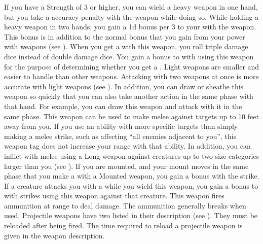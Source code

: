         If you have a Strength of 3 or higher, you can wield a heavy weapon in one hand, but you take a  accuracy penalty with the weapon while doing so.
        While holding a heavy weapon in two hands, you gain a \plus1d bonus per 3  to your  with the weapon.
        This bonus is in addition to the normal bonus that you gain from your power with weapons (see ).
         When you get a  with this weapon, you roll triple damage dice instead of double damage dice.
         You gain a  bonus to  with  using this weapon for the purpose of determining whether you get a .
         Light weapons are smaller and easier to handle than other weapons.
        Attacking with two weapons at once is more accurate with light weapons (see ).
        In addition, you can draw or sheathe this weapon so quickly that you can also take another action in the same phase with that hand.
        For example, you can draw this weapon and attack with it in the same phase.
        \label{Long Weapon} This weapon can be used to make melee  against targets up to 10 feet away from you.
        If you use an ability with more specific targets than simply making a melee strike, such as affecting ``all enemies adjacent to you'', this weapon tag does not increase your range with that ability.
        In addition, you can inflict  with melee  using a Long weapon against creatures up to two size categories larger than you (see ).
        \label{Mounted Weapon} If you are mounted, and your mount moves in the same phase that you make a  with a Mounted weapon, you gain a   bonus with the strike.
         If a creature attacks you with a   while you wield this weapon, you  gain a  bonus to  with strikes using this weapon against that creature.
         This weapon fires ammunition at range to deal damage.
        The ammunition generally breaks when used.
        Projectile weapons have two  listed in their description (see ).
        They must be reloaded after being fired.
        The time required to reload a projectile weapon is given in the weapon description.
